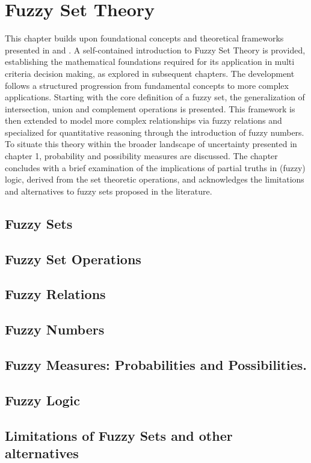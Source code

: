 \chapter{Fuzzy Set Theory}
\label{ch:FStheory}
This chapter builds upon foundational concepts and theoretical frameworks presented in \cite{FULLER1} and \cite{FULLER2}. A self-contained introduction to Fuzzy Set Theory is provided, establishing the mathematical foundations required for its application in multi criteria decision making, as explored in subsequent chapters. The development follows a structured progression from fundamental concepts to more complex applications. Starting with the core definition of a fuzzy set, the generalization of intersection, union and complement operations is presented. This framework is then extended to model more complex relationships via fuzzy relations and specialized for quantitative reasoning through the introduction of fuzzy numbers. To situate this theory within the broader landscape of uncertainty presented in chapter 1, probability and possibility measures are discussed. The chapter concludes with a brief examination of the implications of partial truths in (fuzzy) logic, derived from the set theoretic operations, and acknowledges the limitations and alternatives to fuzzy sets proposed in the literature.

\section{Fuzzy Sets}
\label{sec:fuzzy_sets}

\section{Fuzzy Set Operations} \label{sec:set_operations}

\section{Fuzzy Relations}
\label{sec:relations}

\section{Fuzzy Numbers}\label{sec:fuzzy_numbers}

\section{Fuzzy Measures: Probabilities and Possibilities.} \label{sec:fuzzy_measures}

\section{Fuzzy Logic}\label{sec:fuzzy_logic}


\section{Limitations of Fuzzy Sets and other alternatives}
